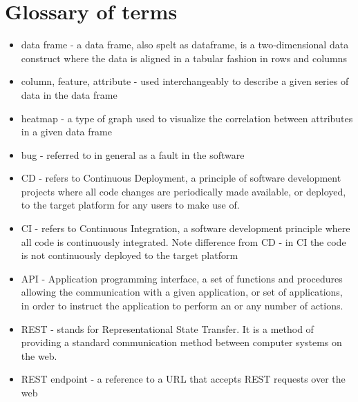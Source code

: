 \section{Glossary of terms}
\begin{itemize}
    \item data frame - a data frame, also spelt as dataframe, is a two-dimensional data construct where the data is aligned in a tabular fashion in rows and columns
    \item column, feature, attribute - used interchangeably to describe a given series of data in the data frame
    \item heatmap - a type of graph used to visualize the correlation between attributes in a given data frame
    \item bug - referred to in general as a fault in the software
    \item CD - refers to Continuous Deployment, a principle of software development projects where all code changes are periodically made available, or deployed, to the target platform for any users to make use of. 
    \item CI - refers to Continuous Integration, a software development principle where all code is continuously integrated. Note difference from CD - in CI the code is not continuously deployed to the target platform
    \item API - Application programming interface, a set of functions and procedures allowing the communication with a given application, or set of applications, in order to instruct the application to perform an or any number of actions.
    \item REST - stands for Representational State Transfer. It is a method of providing a standard communication method between computer systems on the web.
    \item REST endpoint - a reference to a URL that accepts REST requests over the web
\end{itemize}